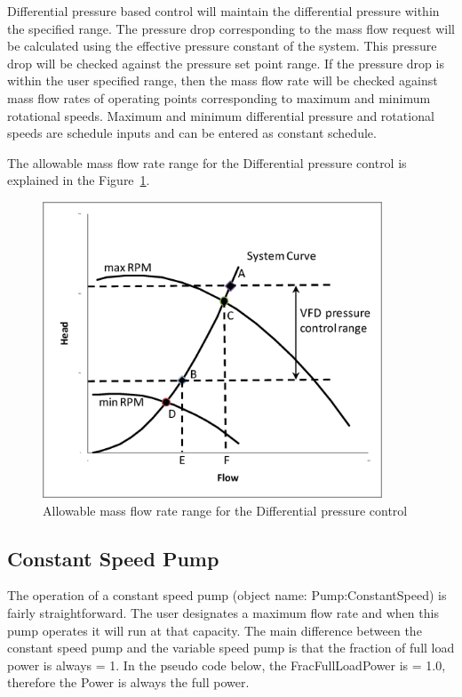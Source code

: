 Differential pressure based control will maintain the differential pressure within the specified range. The pressure drop corresponding to the mass flow request will be calculated using the effective pressure constant of the system. This pressure drop will be checked against the pressure set point range. If the pressure drop is within the user specified range, then the mass flow rate will be checked against mass flow rates of operating points corresponding to maximum and minimum rotational speeds. Maximum and minimum differential pressure and rotational speeds are schedule inputs and can be entered as constant schedule.

The allowable mass flow rate range for the Differential pressure control is explained in the Figure~\ref{fig:allowable-mass-flow-rate-range-for}.

\begin{figure}[hbtp] %
\centering
\includegraphics[width=0.9\textwidth, height=0.9\textheight, keepaspectratio=true]{media/image5856.png}
\caption{Allowable mass flow rate range for the Differential pressure control \protect \label{fig:allowable-mass-flow-rate-range-for}}
\end{figure}

\subsection{Constant Speed Pump}\label{constant-speed-pump}

The operation of a constant speed pump (object name: Pump:ConstantSpeed) is fairly straightforward. The user designates a maximum flow rate and when this pump operates it will run at that capacity. The main difference between the constant speed pump and the variable speed pump is that the fraction of full load power is always = 1. In the pseudo code below, the FracFullLoadPower is = 1.0, therefore the Power is always the full power.

